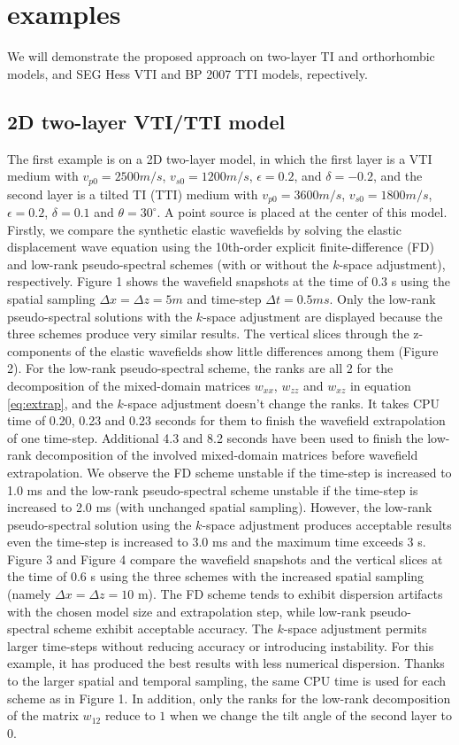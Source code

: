 \section{examples}
We will  demonstrate the proposed approach on two-layer TI and {orthorhombic} models, and  SEG Hess VTI and BP 2007 TTI models, repectively.

\subsection{2D two-layer VTI/TTI model}
The first example is on a 2D two-layer model, in which the first layer is a
VTI medium with $v_{p0}=2500 m/s$, $v_{s0}=1200 m/s$, $\epsilon=0.2$, and $\delta=-0.2$,
and the second layer is a tilted TI (TTI) medium with $v_{p0}=3600 m/s$, $v_{s0}=1800 m/s$,
$\epsilon=0.2$, $\delta=0.1$ and $\theta=30^{\circ}$. 
A point source is placed at the center of this model.
Firstly, we compare the synthetic elastic wavefields by solving the elastic
displacement wave equation using the 10th-order explicit finite-difference (FD) and low-rank
pseudo-spectral schemes (with or without the $k$-space adjustment), respectively.
Figure 1 shows the wavefield snapshots at the time of 0.3 s using the spatial sampling
$\Delta{x}=\Delta{z}=5 m$ and time-step $\Delta{t}=0.5 ms$.
Only the low-rank pseudo-spectral solutions with the $k$-space adjustment are displayed because 
the three schemes produce very similar results. The vertical slices through the z-components of 
the elastic wavefields show little differences among them (Figure 2).
For the low-rank pseudo-spectral scheme, the ranks are all $2$ for the decomposition of the mixed-domain matrices
$w_{xx}$, $w_{zz}$ and $w_{xz}$ in equation \ref{eq:extrap},
and the $k$-space adjustment doesn't change the ranks.
It takes CPU time of 0.20, 0.23 and 0.23 seconds for them to finish the wavefield extrapolation of one time-step.
Additional 4.3 and 8.2 seconds have been used to finish the low-rank decomposition of the involved mixed-domain matrices
before wavefield extrapolation.
We observe the FD scheme unstable if the time-step is increased to 1.0 ms and 
the low-rank pseudo-spectral scheme unstable if the time-step is increased to 2.0
ms (with unchanged spatial sampling). However, the low-rank pseudo-spectral solution using the $k$-space adjustment 
produces acceptable results even the time-step is increased to 3.0 ms
and the maximum time exceeds 3 s.
Figure 3 and Figure 4 compare the wavefield snapshots and the vertical slices at the time of 0.6 s
using the three schemes with the increased spatial sampling (namely $\Delta{x}=\Delta{z}=10$ m).
The FD scheme tends to exhibit dispersion artifacts with the chosen model size and extrapolation step,
while low-rank pseudo-spectral scheme exhibit acceptable accuracy. 
The $k$-space adjustment permits larger time-steps without reducing accuracy or introducing instability.
For this example, it has produced the best results with less numerical dispersion.
Thanks to the larger spatial and temporal sampling, the same CPU time is used for each scheme as in Figure 1.
In addition, only the ranks for the low-rank decomposition of the matrix $w_{12}$ reduce to $1$ when we change the tilt angle of the second layer to $0$.

